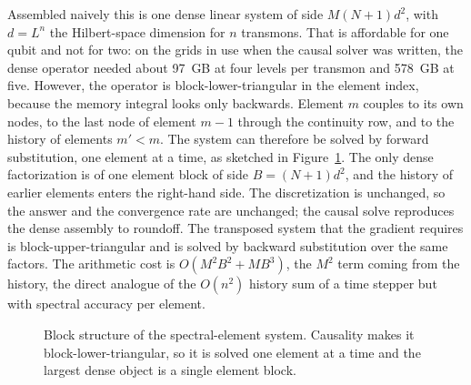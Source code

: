 \documentclass[10pt]{article}
\begin{document}
Assembled naively this is one dense linear system of side $M(N{+}1)d^2$, with
$d = L^n$ the Hilbert-space dimension for $n$ transmons. That is affordable for
one qubit and not for two: on the grids in use when the causal solver was
written, the dense operator needed about 97~GB at four levels per transmon and
578~GB at five. However, the operator is
block-lower-triangular in the element index, because the memory integral looks
only backwards. Element $m$ couples to its own nodes, to the last node of
element $m-1$ through the continuity row, and to the history of elements
$m' < m$. The system can therefore be solved by forward substitution, one
element at a time, as sketched in Figure~\ref{fig:causal}. The only dense
factorization is of one element block of side $B = (N{+}1)d^2$, and the
history of earlier elements enters the right-hand side. The discretization is
unchanged, so the answer and the convergence rate are unchanged; the causal
solve reproduces the dense assembly to roundoff. The transposed system that
the gradient requires is block-upper-triangular and is solved by backward
substitution over the same factors. The arithmetic cost is
$O(M^2 B^2 + M B^3)$, the $M^2$ term coming from the history, the direct
analogue of the $O(n^2)$ history sum of a time stepper but with spectral
accuracy per element.

\begin{figure}[htbp]
\centering
{}
\caption{Block structure of the spectral-element system. Causality makes it
block-lower-triangular, so it is solved one element at a time and the largest
dense object is a single element block.}
\label{fig:causal}
\end{figure}
\end{document}
